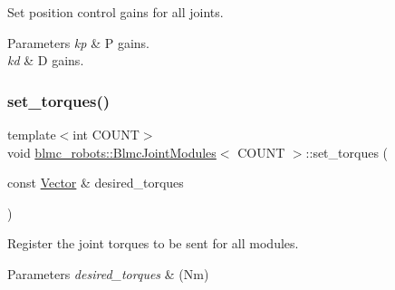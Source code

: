 Set position control gains for all joints. 


\begin{DoxyParams}{Parameters}
{\em kp} & P gains. \\
\hline
{\em kd} & D gains. \\
\hline
\end{DoxyParams}
\mbox{\label{classblmc__robots_1_1BlmcJointModules_ac7dba81727847238fc4c42b7dca6a0ea}} 
\subsubsection{\texorpdfstring{set\+\_\+torques()}{set\_torques()}}
{\footnotesize\ttfamily template$<$int C\+O\+U\+NT$>$ \\
void \hyperlink{classblmc__robots_1_1BlmcJointModules}{blmc\+\_\+robots\+::\+Blmc\+Joint\+Modules}$<$ C\+O\+U\+NT $>$\+::set\+\_\+torques (\begin{DoxyParamCaption}\item[{const \hyperlink{classblmc__robots_1_1BlmcJointModules_abaff382c6fd4b494ec0c17498d94919e}{Vector} \&}]{desired\+\_\+torques }\end{DoxyParamCaption})\hspace{0.3cm}{\ttfamily [inline]}}



Register the joint torques to be sent for all modules. 


\begin{DoxyParams}{Parameters}
{\em desired\+\_\+torques} & (Nm) \\
\hline
\end{DoxyParams}
\mbox{\label{classblmc__robots_1_1BlmcJointModules_abc94960666d33b6a5071d4cf25f7794d}} 
